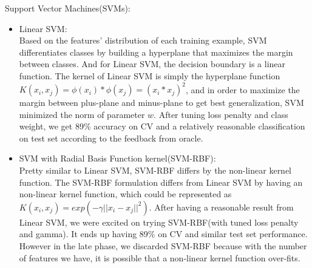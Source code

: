 Support Vector Machines(SVMs):\\
\begin{itemize}
	\item Linear SVM:\\
	Based on the features' distribution of each training example, SVM differentiates classes by building a hyperplane that maximizes the margin between classes. And for Linear SVM, the decision boundary is a linear function. The kernel of Linear SVM is simply the hyperplane function $K(x_i,x_j) = \phi(x_i)*\phi(x_j) = (x_i*x_j)^2$, and in order to maximize the margin between plus-plane and minus-plane to get best generalization, SVM minimized the norm of parameter $w$\cite{b12}. After tuning loss penalty and class weight, we get 89\% accuracy on CV and a relatively reasonable classification on test set according to the feedback from oracle.\\
	\item SVM with Radial Basis Function kernel(SVM-RBF):\\
	Pretty similar to Linear SVM, SVM-RBF differs by the non-linear kernel function. The SVM-RBF formulation differs from Linear SVM by having an non-linear kernel function, which could be represented as $K(x_i,x_j) = exp(-\gamma||x_i - x_j ||^2)$\cite{b12}. After having a reasonable result from Linear SVM, we were excited on trying SVM-RBF(with tuned loss penalty and gamma). It ends up having 89\% on CV and similar test set performance. However in the late phase, we discarded SVM-RBF because with the number of features we have, it is possible that a non-linear kernel function over-fits. \\
\end{itemize}

